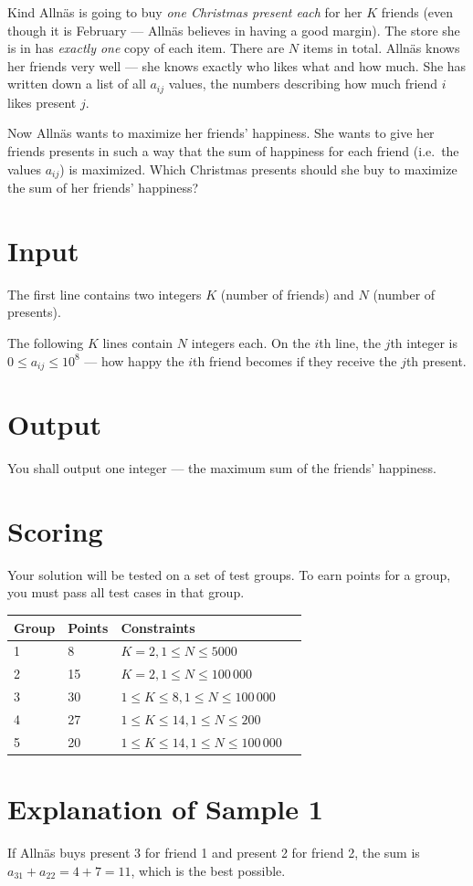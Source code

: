 Kind Allnäs is going to buy \emph{one Christmas present each} for her $K$ friends (even though it is February --- Allnäs believes in having a good margin).
The store she is in has \emph{exactly one} copy of each item.
There are $N$ items in total.
Allnäs knows her friends very well --- she knows exactly who likes what and how much.
She has written down a list of all $a_{ij}$ values, the numbers describing how much friend $i$ likes present $j$.

Now Allnäs wants to maximize her friends' happiness.
She wants to give her friends presents in such a way that the sum of happiness for each friend (i.e.\ the values $a_{ij}$) is maximized.
Which Christmas presents should she buy to maximize the sum of her friends' happiness?

\section*{Input}
The first line contains two integers $K$ (number of friends) and $N$ (number of presents).

The following $K$ lines contain $N$ integers each.
On the $i$th line, the $j$th integer is $0 \le a_{ij} \le 10^8$ --- how happy the $i$th friend becomes if they receive the $j$th present.

\section*{Output}
You shall output one integer --- the maximum sum of the friends' happiness.

\section*{Scoring}
Your solution will be tested on a set of test groups. To earn points for a group, you must pass all test cases in that group.

\noindent
\begin{tabular}{| l | l | l | l |}
\hline
Group & Points & Constraints \\ \hline
1     & 8          & $K = 2, 1 \le N \le 5000$ \\ \hline
2     & 15         & $K = 2, 1 \le N \le 100\,000$ \\ \hline
3     & 30         & $1 \le K \le 8, 1 \le N \le 100\,000$ \\ \hline
4     & 27         & $1 \le K \le 14, 1 \le N \le 200$ \\ \hline
5     & 20         & $1 \le K \le 14, 1 \le N \le 100\,000$ \\ \hline
\end{tabular}

\section*{Explanation of Sample 1}
If Allnäs buys present 3 for friend 1 and present 2 for friend 2, the sum is $a_{31} + a_{22} = 4 + 7 = 11$, which is the best possible.
